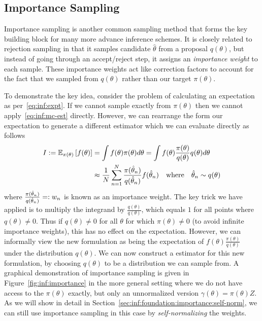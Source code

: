 
\subsection{Importance Sampling}
\label{sec:inf:foundation:importance}

Importance sampling is another common sampling method that forms the key building block
for many more advance inference schemes.  It is closely related to rejection sampling in that
it samples candidate $\hat{\theta}$ from a proposal $q(\theta)$, but instead of going
through an accept/reject step, it assigns an \emph{importance weight} to each sample.
These importance weights act like correction factors to account for the fact that we sampled
from $q(\theta)$ rather than our target $\pi(\theta)$.

To demonstrate the key idea, consider the problem of calculating an expectation as
per~\eqref{eq:inf:expt}.  If we cannot sample exactly from $\pi(\theta)$ then we cannot
apply~\eqref{eq:inf:mc-est} directly.  However, we can rearrange the form our expectation
to generate a different \mc estimator which we can evaluate directly as follows
\begin{align}
	I:=\mathbb{E}_{\pi(\theta)} \left[f(\theta)\right] &=\int f(\theta) \pi(\theta) d\theta 
	= \int f(\theta) \frac{\pi(\theta)}{q(\theta)} q(\theta) d\theta \nonumber \\
	&\approx \frac{1}{N} \sum_{n=1}^{N} \frac{\pi(\hat{\theta}_n)}{q(\hat{\theta}_n)} f(\hat{\theta}_n)
	\quad \text{where} \quad \hat{\theta}_n \sim q(\theta) 	\label{eq:inf:importance}
\end{align}
where $\frac{\pi(\hat{\theta}_n)}{q(\hat{\theta}_n)} =: w_n$ is known as an importance weight.
The key trick we have applied is to multiply the integrand by $\frac{q(\theta)}{q(\theta)}$, which
equals $1$
for all points where $q(\theta) \neq 0$.  Thus if $q(\theta) \neq 0$ for all $\theta$ for which
$\pi(\theta) \neq 0$ (to avoid infinite importance weights), this has no effect on the 
expectation.  However, we can informally view the new
formulation as being the expectation of $f(\theta) \frac{\pi(\theta)}{q(\theta)}$ under the
distribution $q(\theta)$.  We can now construct a \mc estimator for this new formulation, 
by choosing $q(\theta)$ to be a distribution we can sample from.  A graphical
demonstration of importance sampling is given in Figure~\ref{fig:inf:importance} in the
more general setting where we do not have access to the $\pi(\theta)$ exactly, but only
an unnormalized version $\gamma(\theta)=\pi(\theta)Z$.  As we will show in detail in
Section~\ref{sec:inf:foundation:importance:self-norm}, we can still use importance sampling
in this case by \emph{self-normalizing} the weights.

